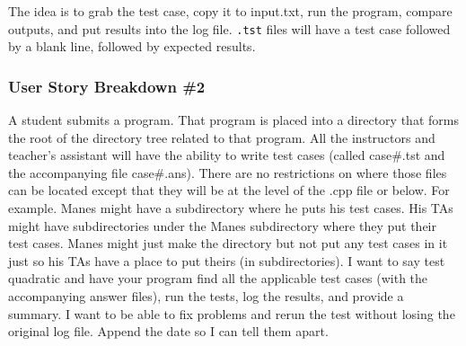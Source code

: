 The idea is to grab the test case, copy it to input.txt, run the program, compare outputs, and put results into the log file. {\tt .tst} files will have a test case followed by a blank line, followed by expected results.

\subsubsection{User Story Breakdown \#2}
A student submits a program.  That program is placed into a directory that forms the root of the directory tree related to that program.  All the instructors and teacher's assistant will have the ability to write test cases (called case\#.tst and the accompanying file case\#.ans).  There are no restrictions on where those files can be located except that they will be at the level of the .cpp file or below.  For example. Manes might have a subdirectory where he puts his test cases.  His TAs might have subdirectories under the Manes subdirectory where they put their test cases.  Manes might just make the directory but not put any test cases in it just so his TAs have a place to put theirs (in subdirectories).  I want to say 
test quadratic
and have your program find all the applicable test cases (with the accompanying answer files), run the tests, log the results, and provide a summary.  I want to be able to fix problems and rerun the test without losing the original log file.  Append the date so I can tell them apart.

